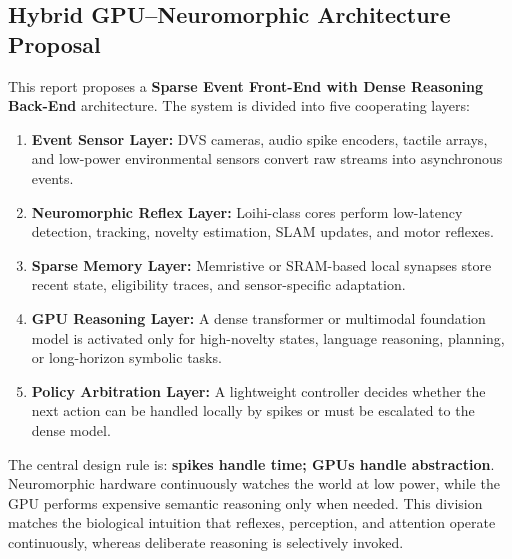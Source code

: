 \documentclass[11pt]{article}
\begin{document}
\subsection{Hybrid GPU--Neuromorphic Architecture Proposal}
This report proposes a \textbf{Sparse Event Front-End with Dense Reasoning Back-End} architecture. The system is divided into five cooperating layers:
\begin{enumerate}
    \item \textbf{Event Sensor Layer:} DVS cameras, audio spike encoders, tactile arrays, and low-power environmental sensors convert raw streams into asynchronous events.
    \item \textbf{Neuromorphic Reflex Layer:} Loihi-class cores perform low-latency detection, tracking, novelty estimation, SLAM updates, and motor reflexes.
    \item \textbf{Sparse Memory Layer:} Memristive or SRAM-based local synapses store recent state, eligibility traces, and sensor-specific adaptation.
    \item \textbf{GPU Reasoning Layer:} A dense transformer or multimodal foundation model is activated only for high-novelty states, language reasoning, planning, or long-horizon symbolic tasks.
    \item \textbf{Policy Arbitration Layer:} A lightweight controller decides whether the next action can be handled locally by spikes or must be escalated to the dense model.
\end{enumerate}

The central design rule is: \textbf{spikes handle time; GPUs handle abstraction}. Neuromorphic hardware continuously watches the world at low power, while the GPU performs expensive semantic reasoning only when needed. This division matches the biological intuition that reflexes, perception, and attention operate continuously, whereas deliberate reasoning is selectively invoked.
\end{document}
